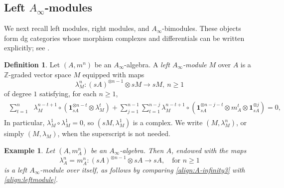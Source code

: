 \documentclass[a4paper, 11pt]{amsart}
\newtheorem{exm}[thm]{Example}
\theoremstyle{definition}
\newtheorem{defn}[thm]{Definition}
\theoremstyle{remark}
\numberwithin{equation}{section}
\begin{document}
\subsection{Left \texorpdfstring{$A_{\infty}$}{}-modules}
We next recall left modules, right modules, and $A_\infty$-bimodules. These objects form dg categories whose morphism complexes and differentials can be written explicitly; see \cite[Section 3]{Kel01a}.

\begin{defn}
Let $(A, m^n)$ be an $A_\infty$-algebra. A {\it left $A_\infty$-module} $M$ over $A$ is a $\mathbb Z$-graded vector space $M$ equipped with maps
\[
\lambda_M^n \colon (sA)^{\otimes n-1} \otimes sM \to sM, \ n\geq 1
\]
of degree $1$ satisfying, for each $n\geq 1$,
\begin{align}\label{align:leftmodule}
\begin{aligned}
\sum_{t=1}^{n}& \lambda_M^{n-t+1}\circ (\mathbf 1_{sA} ^{\otimes n-t} \otimes \lambda_M^t ) + \sum_{j=1}^{n-1}\sum_{t=1}^{n-j} \lambda_M^{n-t+1}\circ (\mathbf 1_{sA} ^{\otimes n-j-t } \otimes m_A^t \otimes \mathbf 1_{sA} ^{\otimes j}) = 0,
\end{aligned}
\end{align}
In particular, $\lambda_M^1\circ \lambda_M^1=0$, so $(sM,\lambda_M^1)$ is a complex. We write $(M,\lambda_M^n)$, or simply $(M,\lambda_M)$, when the superscript is not needed.
\end{defn}

\begin{exm}
Let $(A, m_A^n)$ be an $A_\infty$-algebra. Then $A$, endowed with the maps
\[
\lambda^n_A =m^n_A\colon (sA)^{\otimes n-1} \otimes sA \to sA, \quad \text{for $n\geq 1$}
\]
is a left $A_\infty$-module over itself, as follows by comparing \eqref{align:A-infinity3} with \eqref{align:leftmodule}.
\end{exm}
\end{document}
